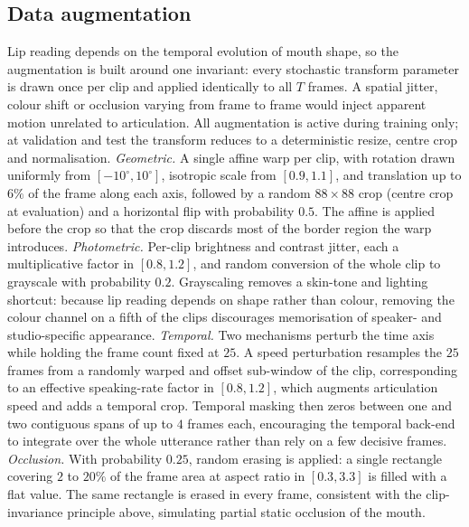 \documentclass[10pt, a4paper]{article}
\begin{document}
\subsection{Data augmentation}
\label{sec:aug}
\noindent Lip reading depends on the temporal evolution of mouth shape, so the augmentation is built around one invariant: every stochastic transform parameter is drawn once per clip and applied identically to all $T$ frames. A spatial jitter, colour shift or occlusion varying from frame to frame would inject apparent motion unrelated to articulation. All augmentation is active during training only; at validation and test the transform reduces to a deterministic resize, centre crop and normalisation.
\noindent\emph{Geometric.} A single affine warp per clip, with rotation drawn uniformly from $[-10^\circ,10^\circ]$, isotropic scale from $[0.9,1.1]$, and translation up to $6\%$ of the frame along each axis, followed by a random $88\times88$ crop (centre crop at evaluation) and a horizontal flip with probability $0.5$. The affine is applied before the crop so that the crop discards most of the border region the warp introduces.
\noindent\emph{Photometric.} Per-clip brightness and contrast jitter, each a multiplicative factor in $[0.8,1.2]$, and random conversion of the whole clip to grayscale with probability $0.2$. Grayscaling removes a skin-tone and lighting shortcut: because lip reading depends on shape rather than colour, removing the colour channel on a fifth of the clips discourages memorisation of speaker- and studio-specific appearance.
\noindent\emph{Temporal.} Two mechanisms perturb the time axis while holding the frame count fixed at $25$. A speed perturbation resamples the $25$ frames from a randomly warped and offset sub-window of the clip, corresponding to an effective speaking-rate factor in $[0.8,1.2]$, which augments articulation speed and adds a temporal crop. Temporal masking then zeros between one and two contiguous spans of up to $4$ frames each, encouraging the temporal back-end to integrate over the whole utterance rather than rely on a few decisive frames.
\noindent\emph{Occlusion.} With probability $0.25$, random erasing is applied: a single rectangle covering $2$ to $20\%$ of the frame area at aspect ratio in $[0.3,3.3]$ is filled with a flat value. The same rectangle is erased in every frame, consistent with the clip-invariance principle above, simulating partial static occlusion of the mouth.
\end{document}
